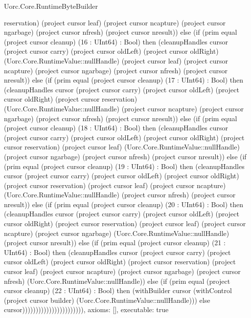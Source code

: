 \begin{lexlean}{Uorc.Core.RuntimeByteBuilder}
\begin{semanticmodule}
{reservation) (project cursor leaf) (project cursor ncapture) (project cursor ngarbage) (project cursor nfresh) (project cursor nresult)) else (if (prim equal (project cursor cleanup) (16 : UInt64) : Bool) then (cleanupHandles cursor (project cursor carry) (project cursor oldLeft) (project cursor oldRight) (Uorc.Core.RuntimeValue::nullHandle) (project cursor leaf) (project cursor ncapture) (project cursor ngarbage) (project cursor nfresh) (project cursor nresult)) else (if (prim equal (project cursor cleanup) (17 : UInt64) : Bool) then (cleanupHandles cursor (project cursor carry) (project cursor oldLeft) (project cursor oldRight) (project cursor reservation) (Uorc.Core.RuntimeValue::nullHandle) (project cursor ncapture) (project cursor ngarbage) (project cursor nfresh) (project cursor nresult)) else (if (prim equal (project cursor cleanup) (18 : UInt64) : Bool) then (cleanupHandles cursor (project cursor carry) (project cursor oldLeft) (project cursor oldRight) (project cursor reservation) (project cursor leaf) (Uorc.Core.RuntimeValue::nullHandle) (project cursor ngarbage) (project cursor nfresh) (project cursor nresult)) else (if (prim equal (project cursor cleanup) (19 : UInt64) : Bool) then (cleanupHandles cursor (project cursor carry) (project cursor oldLeft) (project cursor oldRight) (project cursor reservation) (project cursor leaf) (project cursor ncapture) (Uorc.Core.RuntimeValue::nullHandle) (project cursor nfresh) (project cursor nresult)) else (if (prim equal (project cursor cleanup) (20 : UInt64) : Bool) then (cleanupHandles cursor (project cursor carry) (project cursor oldLeft) (project cursor oldRight) (project cursor reservation) (project cursor leaf) (project cursor ncapture) (project cursor ngarbage) (Uorc.Core.RuntimeValue::nullHandle) (project cursor nresult)) else (if (prim equal (project cursor cleanup) (21 : UInt64) : Bool) then (cleanupHandles cursor (project cursor carry) (project cursor oldLeft) (project cursor oldRight) (project cursor reservation) (project cursor leaf) (project cursor ncapture) (project cursor ngarbage) (project cursor nfresh) (Uorc.Core.RuntimeValue::nullHandle)) else (if (prim equal (project cursor cleanup) (22 : UInt64) : Bool) then (withBuilder cursor (withControl (project cursor builder) (Uorc.Core.RuntimeValue::nullHandle))) else cursor))))))))))))))))))))))),
  axioms: [],
  executable: true
}


\end{semanticmodule}
\end{lexlean}
